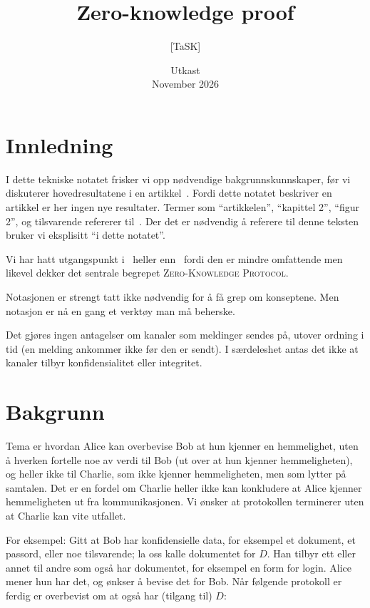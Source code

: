\documentclass[a4paper, parskip=half]{scrartcl}
\title{Zero-knowledge proof}
\author{[TaSK]}
\date{Utkast\\November 2026}
\theoremstyle{definition}
\begin{document}
\maketitle


\section{Innledning}
I dette tekniske notatet frisker vi opp nødvendige
bakgrunnskunnskaper, før vi diskuterer hovedresultatene i en
artikkel~\cite{Goldreich1986Proofs,Goldreich1991Proofs}.
Fordi dette notatet beskriver en artikkel er her ingen nye resultater.
Termer som ``artikkelen'', ``kapittel 2'', ``figur 2'', og tilsvarende
refererer til~\cite{Goldreich1986Proofs}.  Der det er nødvendig å
referere til denne teksten bruker vi eksplisitt ``i dette notatet''.

Vi har hatt utgangspunkt i~\cite{Goldreich1986Proofs} heller
enn~\cite{Goldreich1991Proofs} fordi den er mindre omfattende men
likevel dekker det sentrale begrepet \textsc{Zero-Knowledge Protocol}.

Notasjonen er strengt tatt ikke nødvendig for å få grep om konseptene.
Men notasjon er nå en gang et verktøy man må beherske.

Det gjøres ingen antagelser om kanaler som meldinger sendes på, utover
ordning i tid (en melding ankommer ikke før den er sendt).  I
særdeleshet antas det ikke at kanaler tilbyr konfidensialitet eller
integritet.

\section{Bakgrunn}
\label{sec:bakgrunn}
Tema er hvordan  Alice kan overbevise Bob at hun kjenner en
hemmelighet, uten å hverken fortelle noe av verdi til Bob (ut over at
hun kjenner hemmeligheten), og heller ikke til Charlie, som ikke
kjenner hemmeligheten, men som lytter på samtalen.  Det er en fordel om
Charlie heller ikke kan konkludere at Alice kjenner hemmeligheten ut
fra kommunikasjonen.  Vi ønsker at protokollen terminerer uten at
Charlie kan vite utfallet.

For eksempel: Gitt at Bob har konfidensielle data, for eksempel
et dokument, et passord, eller noe tilsvarende; la oss kalle
dokumentet for $D$.  Han tilbyr ett eller annet til andre som også har
dokumentet, for eksempel en form for 
login.  Alice mener hun har det, og ønkser å bevise det for Bob.  Når
følgende protokoll er ferdig er  overbevist om at også
 har (tilgang til) $D$:
\end{document}
